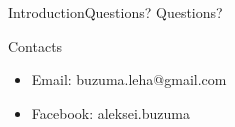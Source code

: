 \documentclass[10pt]{beamer}
\begin{document}
\begin{frame}{Introduction}{Questions?}
	\large Questions?
	\begin{center}
		
		\begin{block}{Contacts}
			\begin{itemize}
				\item Email:    buzuma.leha@gmail.com
				\item Facebook: aleksei.buzuma
			\end{itemize}
		\end{block}
		
	\end{center}
\end{frame}
\end{document}
